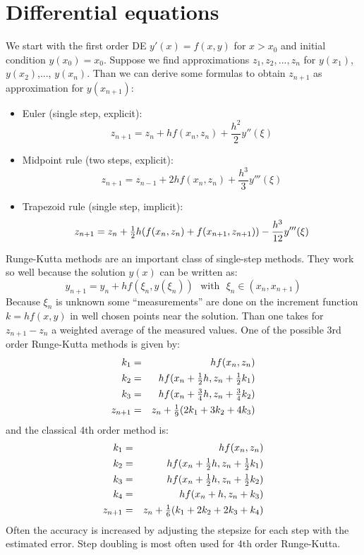 \documentclass[twoside]{report}
\begin{document}
\section{Differential equations}
We start with the first order DE $y'(x)=f(x,y)$ for $x>x_0$ and initial condition
$y(x_0)=x_0$. Suppose we find approximations $z_1,z_2,...,z_n$ for $y(x_1)$,
$y(x_2)$,..., $y(x_n)$. Than we can derive some formulas to obtain
$z_{n+1}$ as approximation for $y(x_{n+1})$:
\begin{itemize}
\item Euler (single step, explicit):
\[
z_{n+1}=z_n+hf(x_n,z_n)+\frac{h^2}{2}y''(\xi)
\]
\item Midpoint rule (two steps, explicit):
\[
z_{n+1}=z_{n-1}+2hf(x_n,z_n)+\frac{h^3}{3}y'''(\xi)
\]
\item Trapezoid rule (single step, implicit):
\[
z_{n+1}=z_n+\mbox{$\frac{1}{2}$} h(f(x_n,z_n)+f(x_{n+1},z_{n+1}))-\frac{h^3}{12}y'''(\xi)
\]
\end{itemize}
Runge-Kutta methods are an important class of single-step methods. They
work so well because the solution $y(x)$ can be written as:
\[
y_{n+1}=y_n+hf(\xi_n,y(\xi_n))~~~\mbox{with}~~~\xi_n\in(x_n,x_{n+1})
\]
Because $\xi_n$ is unknown some ``measurements'' are done on the
increment function $k=hf(x,y)$ in well chosen points near the solution.
Than one takes for $z_{n+1}-z_n$ a weighted average of the measured values.
One of the possible 3rd order Runge-Kutta methods is given by:
\begin{eqnarray*}
k_1&=&hf(x_n,z_n)\\
k_2&=&hf(x_n+\mbox{$\frac{1}{2}$} h,z_n+\mbox{$\frac{1}{2}$} k_1)\\
k_3&=&hf(x_n+\mbox{$\frac{3}{4}$}h,z_n+\mbox{$\frac{3}{4}$}k_2)\\
z_{n+1}&=&z_n+\mbox{$\frac{1}{9}$}(2k_1+3k_2+4k_3)
\end{eqnarray*}
and the classical 4th order method is:
\begin{eqnarray*}
k_1&=&hf(x_n,z_n)\\
k_2&=&hf(x_n+\mbox{$\frac{1}{2}$} h,z_n+\mbox{$\frac{1}{2}$} k_1)\\
k_3&=&hf(x_n+\mbox{$\frac{1}{2}$} h,z_n+\mbox{$\frac{1}{2}$} k_2)\\
k_4&=&hf(x_n+h,z_n+k_3)\\
z_{n+1}&=&z_n+\mbox{$\frac{1}{6}$}(k_1+2k_2+2k_3+k_4)
\end{eqnarray*}
Often the accuracy is increased by adjusting the stepsize for each step with
the estimated error. Step doubling is most often used for 4th order Runge-Kutta.
\end{document}
